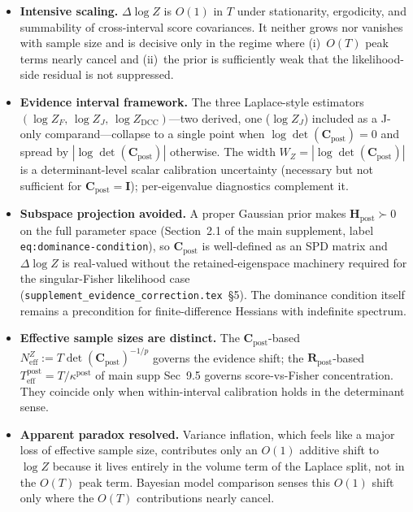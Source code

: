 \documentclass[11pt]{article}
\begin{document}
\begin{itemize}
\item \textbf{Intensive scaling.} $\Delta\log Z$ is $O(1)$ in $T$ under stationarity,
ergodicity, and summability of cross-interval score covariances. It neither grows nor
vanishes with sample size and is decisive only in the regime where (i)~$O(T)$ peak terms
nearly cancel and (ii)~the prior is sufficiently weak that the likelihood-side residual
is not suppressed.
\item \textbf{Evidence interval framework.} The three Laplace-style estimators
$(\log Z_F,\,\log Z_J,\,\log Z_{\mathrm{DCC}})$---two derived, one ($\log Z_J$) included
as a J-only comparand---collapse to a single point when $\log\det(\mathbf C_{\mathrm{post}}) = 0$
and spread by $|\log\det(\mathbf C_{\mathrm{post}})|$ otherwise. The width
$W_Z = |\log\det(\mathbf C_{\mathrm{post}})|$ is a determinant-level scalar calibration
uncertainty (necessary but not sufficient for $\mathbf C_{\mathrm{post}} = \mathbf I$);
per-eigenvalue diagnostics complement it.
\item \textbf{Subspace projection avoided.} A proper Gaussian prior makes
$\mathbf H_{\mathrm{post}} \succ 0$ on the full parameter space (Section~2.1 of the main
supplement, label \texttt{eq:dominance-condition}), so $\mathbf C_{\mathrm{post}}$ is
well-defined as an SPD matrix and $\Delta\log Z$ is real-valued without the
retained-eigenspace machinery required for the singular-Fisher likelihood case
(\texttt{supplement\_evidence\_correction.tex}~\S5). The dominance condition itself remains
a precondition for finite-difference Hessians with indefinite spectrum.
\item \textbf{Effective sample sizes are distinct.} The
$\mathbf C_{\mathrm{post}}$-based $N_{\mathrm{eff}}^{Z} := T\det(\mathbf C_{\mathrm{post}})^{-1/p}$
governs the evidence shift; the $\mathbf R_{\mathrm{post}}$-based
$T_{\mathrm{eff}}^{\mathrm{post}} = T/\kappa^{\mathrm{post}}$ of main supp Sec~9.5 governs
score-vs-Fisher concentration. They coincide only when within-interval calibration holds
in the determinant sense.
\item \textbf{Apparent paradox resolved.} Variance inflation, which feels like a major
loss of effective sample size, contributes only an $O(1)$ additive shift to $\log Z$
because it lives entirely in the volume term of the Laplace split, not in the $O(T)$ peak
term. Bayesian model comparison senses this $O(1)$ shift only where the $O(T)$ contributions
nearly cancel.
\end{itemize}
\end{document}
